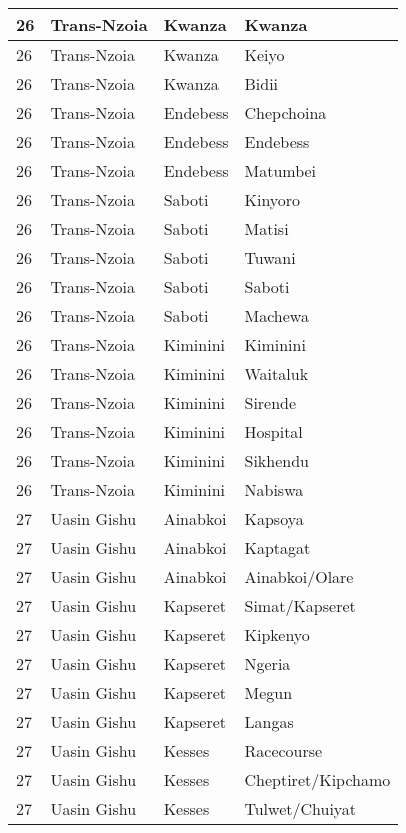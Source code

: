 \begin{table}[!ht]
\begin{tabular}{|l|l|l|l|}
        26 & Trans-Nzoia & Kwanza & Kwanza \\ \hline
        26 & Trans-Nzoia & Kwanza & Keiyo \\ \hline
        26 & Trans-Nzoia & Kwanza & Bidii \\ \hline
        26 & Trans-Nzoia & Endebess & Chepchoina \\ \hline
        26 & Trans-Nzoia & Endebess & Endebess \\ \hline
        26 & Trans-Nzoia & Endebess & Matumbei \\ \hline
        26 & Trans-Nzoia & Saboti & Kinyoro \\ \hline
        26 & Trans-Nzoia & Saboti & Matisi \\ \hline
        26 & Trans-Nzoia & Saboti & Tuwani \\ \hline
        26 & Trans-Nzoia & Saboti & Saboti \\ \hline
        26 & Trans-Nzoia & Saboti & Machewa \\ \hline
        26 & Trans-Nzoia & Kiminini & Kiminini \\ \hline
        26 & Trans-Nzoia & Kiminini & Waitaluk \\ \hline
        26 & Trans-Nzoia & Kiminini & Sirende \\ \hline
        26 & Trans-Nzoia & Kiminini & Hospital \\ \hline
        26 & Trans-Nzoia & Kiminini & Sikhendu \\ \hline
        26 & Trans-Nzoia & Kiminini & Nabiswa \\ \hline
        27 & Uasin Gishu & Ainabkoi & Kapsoya \\ \hline
        27 & Uasin Gishu & Ainabkoi & Kaptagat \\ \hline
        27 & Uasin Gishu & Ainabkoi & Ainabkoi/Olare \\ \hline
        27 & Uasin Gishu & Kapseret & Simat/Kapseret \\ \hline
        27 & Uasin Gishu & Kapseret & Kipkenyo \\ \hline
        27 & Uasin Gishu & Kapseret & Ngeria \\ \hline
        27 & Uasin Gishu & Kapseret & Megun \\ \hline
        27 & Uasin Gishu & Kapseret & Langas \\ \hline
        27 & Uasin Gishu & Kesses & Racecourse \\ \hline
        27 & Uasin Gishu & Kesses & Cheptiret/Kipchamo \\ \hline
        27 & Uasin Gishu & Kesses & Tulwet/Chuiyat \\ \hline

\end{tabular}
\end{table}
